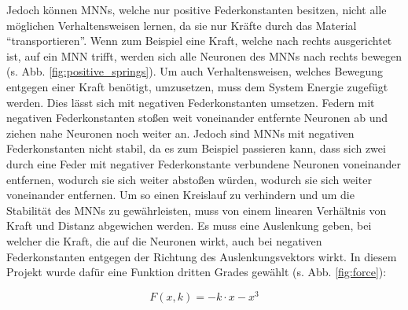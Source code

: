 \documentclass[10pt]{scrartcl}
\begin{document}
Jedoch können MNNs, welche nur positive Federkonstanten besitzen, nicht alle möglichen Verhaltensweisen lernen, da sie nur Kräfte durch das Material \enquote{transportieren}.
Wenn zum Beispiel eine Kraft, welche nach rechts ausgerichtet ist, auf ein MNN trifft, werden sich alle Neuronen des MNNs nach rechts bewegen (s. Abb. \ref{fig:positive_springs}).
Um auch Verhaltensweisen, welches Bewegung entgegen einer Kraft benötigt, umzusetzen, muss dem System Energie zugefügt werden. Dies lässt sich mit negativen Federkonstanten umsetzen. 
Federn mit negativen Federkonstanten stoßen weit voneinander entfernte Neuronen ab und ziehen nahe Neuronen noch weiter an.
Jedoch sind MNNs mit negativen Federkonstanten nicht stabil, da es zum Beispiel passieren kann, dass sich zwei durch eine Feder mit negativer Federkonstante verbundene Neuronen voneinander entfernen, wodurch sie sich weiter abstoßen würden, wodurch sie sich weiter voneinander entfernen.
Um so einen Kreislauf zu verhindern und um die Stabilität des MNNs zu gewährleisten, muss von einem linearen Verhältnis von Kraft und Distanz abgewichen werden.
Es muss eine Auslenkung geben, bei welcher die Kraft, die auf die Neuronen wirkt, auch bei negativen Federkonstanten entgegen der Richtung des Auslenkungsvektors wirkt. In diesem Projekt wurde dafür eine Funktion dritten Grades gewählt (s. Abb. \ref{fig:force}):

{\[
    F(x, k) = -k \cdot  x -  x^3
\]}
\end{document}
